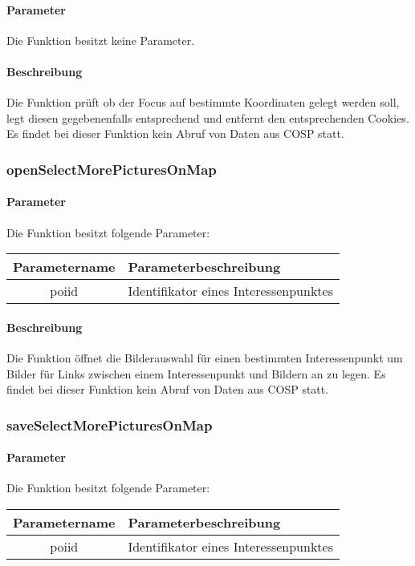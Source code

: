 \paragraph{Parameter} Die Funktion besitzt keine Parameter.
\paragraph{Beschreibung} Die Funktion prüft ob der Focus auf bestimmte Koordinaten gelegt werden soll, legt diesen gegebenenfalls entsprechend und entfernt den entsprechenden Cookies. Es findet bei dieser Funktion kein Abruf von Daten aus {\glqq COSP\grqq} statt.
\subsubsection{openSelectMorePicturesOnMap}
\paragraph{Parameter} Die Funktion besitzt folgende Parameter:
\begin{table}[H]
	\begin{tabular}{|c|p{11cm}|}
		\hline
		\textbf{Parametername} & \textbf{Parameterbeschreibung} \\ \hline
		poiid & Identifikator eines Interessenpunktes \\ \hline
	\end{tabular}
\end{table}
\paragraph{Beschreibung} Die Funktion öffnet die Bilderauswahl für einen bestimmten Interessenpunkt um Bilder für Links zwischen einem Interessenpunkt und Bildern an zu legen. Es findet bei dieser Funktion kein Abruf von Daten aus {\glqq COSP\grqq} statt.
\subsubsection{saveSelectMorePicturesOnMap}
\paragraph{Parameter} Die Funktion besitzt folgende Parameter:
\begin{table}[H]
	\begin{tabular}{|c|p{11cm}|}
		\hline
		\textbf{Parametername} & \textbf{Parameterbeschreibung} \\ \hline
		poiid & Identifikator eines Interessenpunktes \\ \hline
	\end{tabular}
\end{table}
